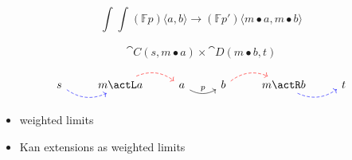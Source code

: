 \documentclass[DaoFP]{subfiles}
\begin{document}
\[ \int_{} \int_{}(\mathbb F p) \langle a, b \rangle \to  (\mathbb F p') \langle m \bullet a, m \bullet b \rangle \]

\[ \cat C (s, m \bullet a) \times \cat D (m \bullet b, t) \]


\[
 \begin{tikzcd}
 s
 \arrow[r, bend right, dashed, blue]
 & m \actL a
  \arrow[r, bend left, dashed, red]
  & a
 \arrow[r, bend right, "p"]
 & b
  \arrow[r, bend left, dashed, red]
 & m \actR b
 \arrow[r, bend right, dashed, blue]
 & t
 \end{tikzcd}
\]




\begin{itemize}
\item weighted limits

\item Kan extensions as weighted limits
\end{itemize}
\end{document}
